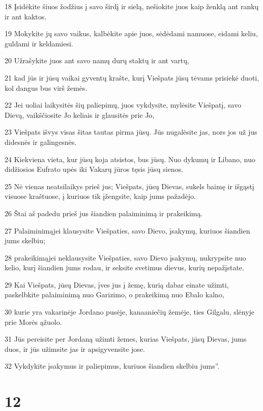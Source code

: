 \par 18 Įsidėkite šiuos žodžius į savo širdį ir sielą, nešiokite juos kaip ženklą ant rankų ir ant kaktos. 
\par 19 Mokykite jų savo vaikus, kalbėkite apie juos, sėdėdami namuose, eidami keliu, guldami ir keldamiesi. 
\par 20 Užrašykite juos ant savo namų durų staktų ir ant vartų, 
\par 21 kad jūs ir jūsų vaikai gyventų krašte, kurį Viešpats jūsų tėvams prisiekė duoti, kol dangus bus virš žemės. 
\par 22 Jei uoliai laikysitės šių paliepimų, juos vykdysite, mylėsite Viešpatį, savo Dievą, vaikščiosite Jo keliais ir glausitės prie Jo, 
\par 23 Viešpats išvys visas šitas tautas pirma jūsų. Jūs nugalėsite jas, nors jos už jus didesnės ir galingesnės. 
\par 24 Kiekviena vieta, kur jūsų koja atsistos, bus jūsų. Nuo dykumų ir Libano, nuo didžiosios Eufrato upės iki Vakarų jūros tęsis jūsų sienos. 
\par 25 Nė vienas neatsilaikys prieš jus; Viešpats, jūsų Dievas, sukels baimę ir išgąstį visuose kraštuose, į kuriuos tik įžengsite, kaip jums pažadėjo. 
\par 26 Štai aš padedu prieš jus šiandien palaiminimą ir prakeikimą. 
\par 27 Palaiminimą­jei klausysite Viešpaties, savo Dievo, įsakymų, kuriuos šiandien jums skelbiu; 
\par 28 prakeikimą­jei neklausysite Viešpaties, savo Dievo įsakymų, nukrypsite nuo kelio, kurį šiandien jums rodau, ir seksite svetimus dievus, kurių nepažįstate. 
\par 29 Kai Viešpats, jūsų Dievas, įves jus į žemę, kurią dabar einate užimti, paskelbkite palaiminimą nuo Garizimo, o prakeikimą­ nuo Ebalo kalno, 
\par 30 kurie yra vakarinėje Jordano pusėje, kanaaniečių žemėje, ties Gilgalu, slėnyje prie Morės ąžuolo. 
\par 31 Jūs pereisite per Jordaną užimti žemes, kurias Viešpats, jūsų Dievas, jums duos, ir jūs užimsite jas ir apsigyvensite jose. 
\par 32 Vykdykite įsakymus ir paliepimus, kuriuos šiandien skelbiu jums”.



\chapter{12}



